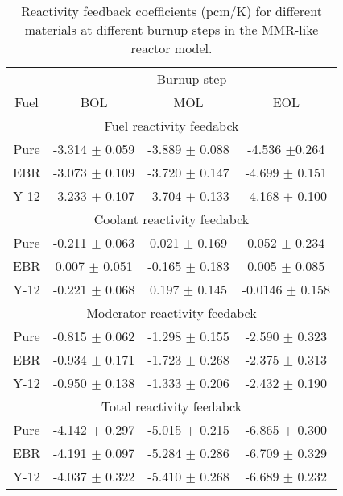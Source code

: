 \begin{table}[ht]
        \centering 
        \caption{Reactivity feedback coefficients (pcm/K) for different 
        materials at different burnup steps in the \gls{MMR}-like 
        reactor model.}
        \label{tab:coeff_mmr}
        \begin{tabular}{c c c c}
                \hline 
                & \multicolumn{3}{c}{Burnup step} \\
                Fuel & \gls{BOL} & \gls{MOL} & \gls{EOL} \\
                \hline 
                \multicolumn{4}{c}{Fuel reactivity feedabck}\\
                Pure & -3.314 $\pm$ 0.059 & -3.889 $\pm$ 0.088 & -4.536 $\pm$0.264\\
                \gls{EBR} & -3.073 $\pm$ 0.109 & -3.720 $\pm$ 0.147 & -4.699 $\pm$ 0.151\\
                Y-12 & -3.233 $\pm$ 0.107 & -3.704 $\pm$ 0.133 & -4.168 $\pm$ 0.100\\
                \hline 
                \multicolumn{4}{c}{Coolant reactivity feedabck}\\
                Pure & -0.211 $\pm$ 0.063 & 0.021 $\pm$ 0.169 & 0.052 $\pm$ 0.234\\
                \gls{EBR} & 0.007 $\pm$ 0.051 & -0.165 $\pm$ 0.183 & 0.005 $\pm$ 0.085\\
                Y-12 & -0.221 $\pm$ 0.068 & 0.197 $\pm$ 0.145 & -0.0146 $\pm$ 0.158\\
                \hline 
                \multicolumn{4}{c}{Moderator reactivity feedabck}\\
                Pure & -0.815 $\pm$ 0.062 & -1.298 $\pm$ 0.155 & -2.590 $\pm$ 0.323\\
                \gls{EBR} &-0.934 $\pm$ 0.171 & -1.723 $\pm$ 0.268 & -2.375 $\pm$ 0.313\\
                Y-12 & -0.950 $\pm$ 0.138 & -1.333 $\pm$ 0.206 & -2.432 $\pm$ 0.190\\
                \hline 
                \multicolumn{4}{c}{Total reactivity feedabck}\\
                Pure & -4.142 $\pm$ 0.297 & -5.015 $\pm$ 0.215 & -6.865 $\pm$ 0.300\\
                \gls{EBR} & -4.191 $\pm$ 0.097 & -5.284 $\pm$ 0.286 & -6.709 $\pm$ 0.329\\
                Y-12 & -4.037 $\pm$ 0.322 & -5.410 $\pm$ 0.268 & -6.689 $\pm$ 0.232\\
                \hline 
                
                
        \end{tabular}
\end{table}

